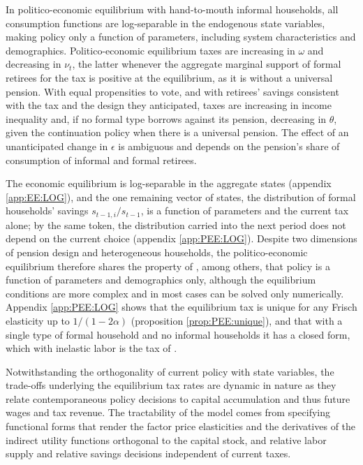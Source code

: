 \begin{proposition}\label{prop:LOG:PEE}
In politico-economic equilibrium with hand-to-mouth informal households, all consumption functions are log-separable in the endogenous state variables, making policy only a function of parameters, including system characteristics and demographics. Politico-economic equilibrium taxes are increasing in $\omega$ and decreasing in $\nu_t$, the latter whenever the aggregate marginal support of formal retirees for the tax is positive at the equilibrium, as it is without a universal pension. With equal propensities to vote, and with retirees' savings consistent with the tax and the design they anticipated, taxes are increasing in income inequality and, if no formal type borrows against its pension, decreasing in $\theta$, given the continuation policy when there is a universal pension. The effect of an unanticipated change in $\epsilon$ is ambiguous and depends on the pension's share of consumption of informal and formal retirees.
\end{proposition}


The economic equilibrium is log-separable in the aggregate states (appendix \ref{app:EE:LOG}), and the one remaining vector of states, the distribution of formal households' savings $s_{t-1,i}/s_{t-1}$, is a function of parameters and the current tax alone; by the same token, the distribution carried into the next period does not depend on the current choice (appendix \ref{app:PEE:LOG}). Despite two dimensions of pension design and heterogeneous households, the politico-economic equilibrium therefore shares the property of \textcite{mkvss08,ssvsde15,Song12a1,UchidaOa1}, among others, that policy is a function of parameters and demographics only, although the equilibrium conditions are more complex and in most cases can be solved only numerically. Appendix \ref{app:PEE:LOG} shows that the equilibrium tax is unique for any Frisch elasticity up to $1/(1-2\alpha)$ (proposition \ref{prop:PEE:unique}), and that with a single type of formal household and no informal households it has a closed form, which with inelastic labor is the tax of \textcite{mkvss08}.

Notwithstanding the orthogonality of current policy with state variables, the trade-offs underlying the equilibrium tax rates are dynamic in nature as they relate contemporaneous policy decisions to capital accumulation and thus future wages and tax revenue. The tractability of the model comes from specifying functional forms that render the factor price elasticities and the derivatives of the indirect utility functions orthogonal to the capital stock, and relative labor supply and relative savings decisions independent of current taxes.

